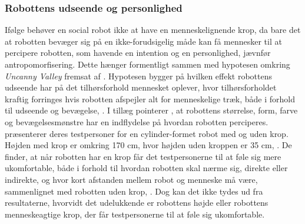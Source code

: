 \subsubsection*{Robottens udseende og personlighed}
\label{InteraktionSocialeRobotterParametreBevaegelsesmoenstreUdseende}
%
Ifølge \textcite[s. 226]{PDF:SocailAndCollaborative} behøver en social robot ikke at have en menneskelignende krop, da bare det at robotten bevæger sig på en ikke-forudsigelig måde kan få mennesker til at percipere robotten, som havende en intention og en personlighed, jævnfør antropomorfisering. Dette hænger formentligt sammen med hypotesen omkring \textit{Uncanny Valley} fremsat af \textcite{PDF:UncannyVally}. Hypotesen bygger på hvilken effekt robottens udseende har på det tilhørsforhold mennesket oplever, hvor tilhørsforholdet kraftig forringes hvis robotten afspejler alt for menneskelige træk, både i forhold til udseende og bevægelse, \textcite{PDF:UncannyVally}. I tillæg pointerer \textcite[s. 226]{PDF:SocailAndCollaborative}, at robottens størrelse, form, farve og bevægelsesmønstre har en indflydelse på hvordan robotten perciperes.\blankline
%
\textcite[s. 189]{PDF:PsychologicalEffects} præsenterer deres testpersoner for en cylinder-formet robot med og uden krop. Højden med krop er omkring 170 cm, hvor højden uden kroppen er 35 cm, \parencite[s. 189]{PDF:PsychologicalEffects}. De finder, at når robotten har en krop får det testpersonerne til at føle sig mere ukomfortable, både i forhold til hvordan robotten skal nærme sig, direkte eller indirekte, og hvor kort afstanden mellem robot og menneske må være, sammenlignet med robotten uden krop, \parencite[s. 196]{PDF:PsychologicalEffects}. Dog kan det ikke tydes ud fra resultaterne, hvorvidt det udelukkende er robottens højde eller robottens menneskeagtige krop, der får testpersonerne til at føle sig ukomfortable.   

